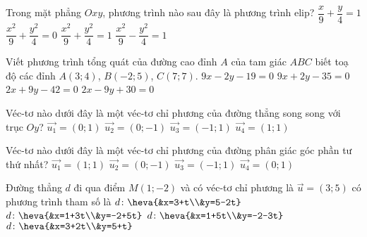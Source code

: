 \begin{ex}%
	Trong mặt phẳng $Oxy$, phương trình nào sau đây là phương trình elip?
	\choice
	{$\dfrac{x}{9}+\dfrac{y}{4}=1$}
	{$\dfrac{x^2}{9}+\dfrac{y^2}{4}=0$}
	{\True $\dfrac{x^2}{9}+\dfrac{y^2}{4}=1$}
	{$\dfrac{x^2}{9}-\dfrac{y^2}{4}=1$}
\end{ex}	
	\begin{ex}%
		Viết phương trình tổng quát của đường cao đỉnh $A$ của tam giác $ABC$ biết toạ độ các đỉnh $A\left( 3;4 \right)$, $B\left( -2;5 \right)$, $C\left( 7;7 \right)$.
		\choice
		{$9x-2y-19=0$}
		{\True $9x+2y-35=0$}
		{$2x+9y-42=0$}
		{$2x-9y+30=0$}
	\end{ex}

	\begin{ex}%
	Véc-tơ nào dưới đây là một véc-tơ chỉ phương của đường thẳng song song với trục $Oy$?
		\choice
	{\True $\overrightarrow{u_{1}}=(0;1)$}
	{$\overrightarrow{u_{2}}=(0;-1)$}
	{$\overrightarrow{u_{3}}=(-1;1)$}
	{$\overrightarrow{u_{4}}=(1;1)$}
\end{ex}
	\begin{ex}%
	Véc-tơ nào dưới đây là một véc-tơ chỉ phương của đường phân giác góc phần tư thứ nhất?
		\choice
	{\True $\overrightarrow{u_{1}}=(1;1)$}
	{$\overrightarrow{u_{2}}=(0;-1)$}
	{$\overrightarrow{u_{3}}=(-1;1)$}
	{$\overrightarrow{u_{4}}=(0;1)$}
\end{ex}

	\begin{ex}%
	Đường thẳng $d$ đi qua điểm $M(1;-2)$ và có  véc-tơ chỉ phương là $\overrightarrow{u}=(3;5)$ có phương trình tham số là
		\choice
	{$d \colon \heva{&x=3+t\\&y=5-2t}$}
	{\True $d \colon \heva{&x=1+3t\\&y=-2+5t}$}
	{$d \colon \heva{&x=1+5t\\&y=-2-3t}$}
	{$d \colon \heva{&x=3+2t\\&y=5+t}$}
\end{ex}

